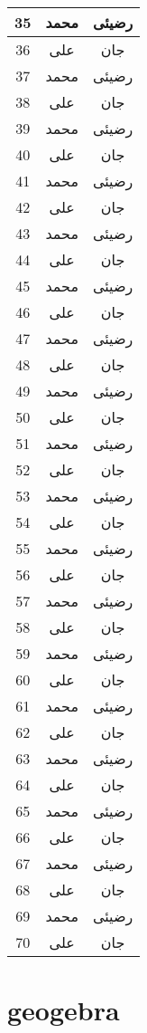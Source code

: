 \documentclass[12pt]{book}
\begin{document}
\begin{center}
\begin{longtable}{ | c | c | c | }
	35 & محمد  & رضیئی \\ \hline
	36 & علی & جان \\ \hline
	37 & محمد  & رضیئی \\ \hline
	38 & علی & جان \\ \hline
	39 & محمد  & رضیئی \\ \hline
	40 & علی & جان \\ \hline
	41 & محمد  & رضیئی \\ \hline
	42 & علی & جان \\ \hline
	43 & محمد  & رضیئی \\ \hline
	44 & علی & جان \\ \hline
	45 & محمد  & رضیئی \\ \hline
	46 & علی & جان \\ \hline
	47 & محمد  & رضیئی \\ \hline
	48 & علی & جان \\ \hline
	49 & محمد  & رضیئی \\ \hline
	50 & علی & جان \\ \hline
	51 & محمد  & رضیئی \\ \hline
	52 & علی & جان \\ \hline
	53 & محمد  & رضیئی \\ \hline
	54 & علی & جان \\ \hline
	55 & محمد  & رضیئی \\ \hline
	56 & علی & جان \\ \hline
	57 & محمد  & رضیئی \\ \hline
	58 & علی & جان \\ \hline
	59 & محمد  & رضیئی \\ \hline
	60 & علی & جان \\ \hline
	61 & محمد  & رضیئی \\ \hline
	62 & علی & جان \\ \hline
	63 & محمد  & رضیئی \\ \hline
	64 & علی & جان \\ \hline
	65 & محمد  & رضیئی \\ \hline
	66 & علی & جان \\ \hline
	67 & محمد  & رضیئی \\ \hline
	68 & علی & جان \\ \hline
	69 & محمد  & رضیئی \\ \hline
	70 & علی & جان \\ \hline
\end{longtable}
\end{center}
\chapter{geogebra}
 
\end{document}

